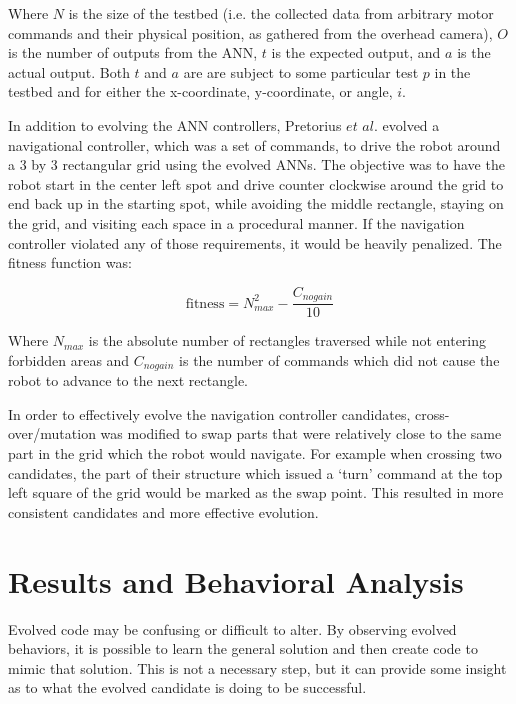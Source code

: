 \documentclass{sig-alternate}
\begin{document}
  Where $N$ is the size of the testbed (i.e. the collected data from arbitrary motor commands and their physical position, as gathered from the overhead camera), $O$ is the number of outputs from the ANN, $t$ is the expected output, and $a$ is the actual output. Both $t$ and $a$ are are subject to some particular test $p$ in the testbed and for either the x-coordinate, y-coordinate, or angle, $i$.
  
  In addition to evolving the ANN controllers, Pretorius $et$ $al.$ evolved a  navigational controller, which was a set of commands, to drive the robot around a 3 by 3 rectangular grid using the evolved ANNs. The objective was to have the robot start in the center left spot and drive counter clockwise around the grid to end back up in the starting spot, while avoiding the middle rectangle, staying on the grid, and visiting each space in a procedural manner. If the navigation controller violated any of those requirements, it would be heavily penalized. The fitness function was:


\[
  \textrm{fitness} = N_{max}^2 - \frac{C_{nogain}}{10}
\] 

Where $N_{max}$ is the absolute number of rectangles traversed while not entering forbidden areas and $C_{nogain}$ is the number of commands which did not cause the robot to advance to the next rectangle.

	In order to effectively evolve the navigation controller candidates, cross-over/mutation was modified to swap parts that were relatively close to the same part in the grid which the robot would navigate. For example when crossing two candidates, the part of their structure which issued a `turn' command at the top left square of the grid would be marked as the swap point. This resulted in more consistent candidates and more effective evolution. 
\section{Results and Behavioral Analysis}\label{behavior}

  Evolved code may be confusing or difficult to alter. By observing evolved behaviors, it is possible to learn the general solution and then create code to mimic that solution. This is not a necessary step, but it can provide some insight as to what the evolved candidate is doing to be successful.
\end{document}
